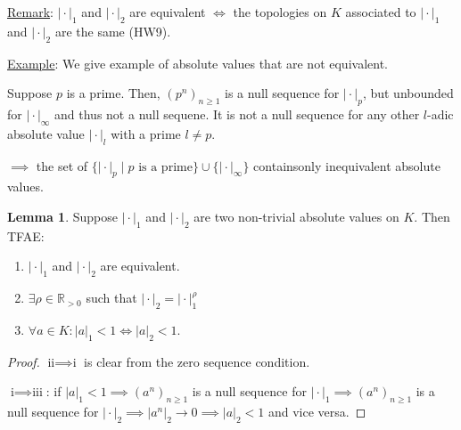 \documentclass[openany]{amsbook}
\numberwithin{section}{chapter}
\theoremstyle{definition}
\newtheorem{lemma}[theorem]{Lemma}
\begin{document}
\underline{Remark}: \(\vert \cdot \vert_1\) and \(\vert \cdot \vert_2\) are equivalent \(\iff\) the topologies on \(K\) associated to \(\vert \cdot \vert _1\) and \(\vert \cdot \vert _2\) are the same (HW9).

\underline{Example}: We give example of absolute values that are not equivalent.

Suppose \(p\) is a prime. Then, \((p^n)_{n \geq 1}\) is a null sequence for \(\vert \cdot \vert_p\), but unbounded for \(\vert \cdot \vert _ \infty \) and thus not a null sequene. It is not a null sequence for any other \(l\)-adic absolute value \(\vert \cdot \vert _l\) with a prime \(l \neq p\).

\(\implies\) the set of \(\{ \vert \cdot \vert_p \mid p \text{ is a prime} \} \cup \{ \vert \cdot \vert _\infty  \} \) containsonly inequivalent absolute values.

\begin{lemma}
    Suppose \(\vert \cdot \vert _1\) and \(\vert \cdot \vert _2\) are two non-trivial absolute values on \(K\). Then TFAE:

    \begin{enumerate}[label=\roman*)]
        \item \(\vert \cdot \vert _1\) and \(\vert \cdot \vert _2\) are equivalent.
        
        \item \(\exists \rho \in \mathbb{R}_{>0}\) such that \(\vert \cdot \vert _2 = \vert \cdot \vert _1^{\rho} \) 
        \item \(\forall a\in K: \vert a \vert_1 < 1 \iff \vert a \vert _2 < 1\).
    \end{enumerate} 
\end{lemma}

\begin{proof}
    \(\text{ii} \implies \text{i}\) is clear from the zero sequence condition.

    \(\text{i} \implies \text{iii}\): if \(\vert a \vert _1 < 1 \implies (a^n)_{n\geq 1}\) is a null sequence for \(\vert \cdot \vert _1 \implies (a^n)_{n\geq 1}\) is a null sequence for \(\vert \cdot \vert _2 \implies \vert a^n \vert_2 \to 0 \implies \vert a \vert _2 < 1\) and vice versa.  
\end{proof}
\end{document}
